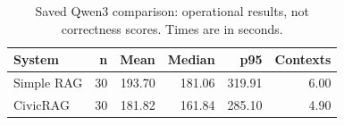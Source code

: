 \begin{table}[htbp]\centering\small
\caption{Saved Qwen3 comparison: operational results, not correctness scores. Times are in seconds.}
\begin{tabularx}{\linewidth}{Xrrrrr}\toprule
System & n & Mean & Median & p95 & Contexts\\\midrule
Simple RAG & 30 & 193.70 & 181.06 & 319.91 & 6.00\\
CivicRAG & 30 & 181.82 & 161.84 & 285.10 & 4.90\\
\bottomrule\end{tabularx}\end{table}
